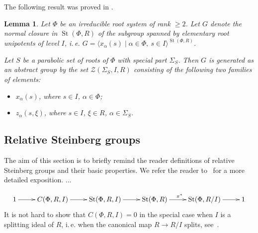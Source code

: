 \documentclass[oneside, 10pt]{amsart}
\newtheorem{lemma}{Lemma}
\theoremstyle{remark}
\theoremstyle{definition}
\DeclareMathOperator{\St}{St}
\numberwithin{equation}{section}
\begin{document}
\begin{comment}
 Stabilization for orthogonal and symplectic K-groups a la Quillen is given by Panin's theorem,  More specifically the bounds for surjective (resp. injective) stability is 
 $\ell \geq \max(6, a+2)$ (resp. $\ell \geq \max(7,a+3)$) for $a=1,2,3$ in the case when $R$ is a field, p.i.d. or a Dedekind domain, respectively.
\end{comment}

The following result was proved in \cite[Proposition~3.2]{Ste13}.
\begin{lemma}\label{lem:Zgen} Let $\Phi$ be an irreducible root system of rank $\geq 2$. 
Let $G$ denote the normal closure in $\St(\Phi, R)$ of the subgroup spanned by elementary root unipotents of level $I$, i.\,e. $G=\langle x_\alpha(s) \mid \alpha\in\Phi,\ s\in I\rangle^{\St(\Phi, R)}$.

Let $S$ be a parabolic set of roots of $\Phi$ with special part $\Sigma_S$. Then $G$ is generated as an abstract group by the set $\mathcal{Z}(\Sigma_S, I, R)$ consisting of the following two families of elements:
\begin{itemize}
 \item $x_{\alpha}(s)$, where $s\in I$, $\alpha\in\Phi$;
 \item $z_\alpha(s,\xi)$, where $s\in I$, $\xi\in R$, $\alpha\in\Sigma_S$.
\end{itemize}        
\end{lemma}

\begin{comment}
Suppose for a moment that $\langle \alpha, \beta \rangle = -1$ and  $\langle \beta, \alpha \rangle = -1$ then
\[ \{s, t^{-1} \} = \{s,  t^{-1}\}_\alpha = \{t, s^{-1} \}_\beta^{-1} = \{s^{-1}, t\} \]
In particular, $\{s, s^{-1}\} = \{s, s^{-1}\}^{-1}$ 
\end{comment}

\subsection{Relative Steinberg groups}

The aim of this section is to briefly remind the reader definitions of relative Steinberg groups and their basic properties. We refer the reader to~\cite[Section~3]{S15} for a more detailed exposition.
...

\begin{equation}\label{eq:relative-St}
 \xymatrix{ 1 \ar[r] & C(\Phi, R, I) \ar[r] & \St(\Phi, R, I) \ar[r] & \St(\Phi, R) \ar[r]^{\pi^*} & \St(\Phi, R/I) \ar[r] & 1 }
\end{equation}
It is not hard to show that $C(\Phi, R, I) = 0$ in the special case when $I$ is a splitting ideal of $R$, i.\,e. when the canonical map $R \to R/I$ splits, see~\cite[Lemma~8]{S15}. 
\end{document}
